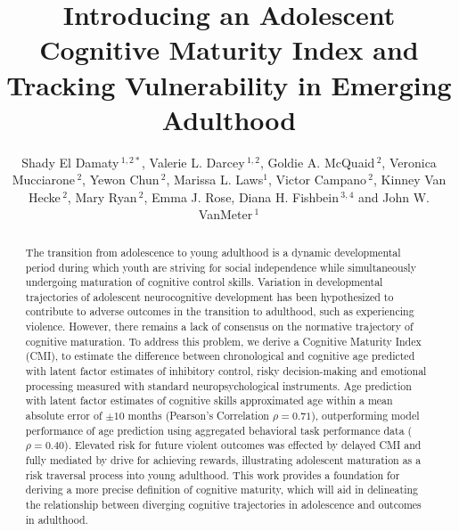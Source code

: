 \documentclass[utf8]{stylesheet}
\def\firstAuthorLast{El Damaty {et~al.}} %
\def\Authors{Shady El Damaty\,$^{1,2*}$, Valerie L. Darcey\,$^{1,2}$, Goldie A. McQuaid\,$^{2}$, Veronica Mucciarone\,$^{2}$, Yewon Chun\,$^{2}$, Marissa L. Laws$^{1}$, Victor Campano\,$^{2}$, Kinney Van Hecke\,$^{2}$, Mary Ryan\,$^{2}$, Emma J. Rose, Diana H. Fishbein\,$^{3,4}$ and John W. VanMeter\,$^{1}$}
\begin{document}
\onecolumn
{}
\title{Introducing an Adolescent Cognitive Maturity Index and Tracking Vulnerability in Emerging Adulthood} 
\author[\firstAuthorLast ]{\Authors} %
\address{} %
\correspondance{} %
\extraAuth{}
\maketitle \begin{abstract}
The transition from adolescence to young adulthood is a dynamic developmental period during which youth are striving for social independence while simultaneously undergoing maturation of cognitive control skills. Variation in developmental trajectories of adolescent neurocognitive development has been hypothesized to contribute to adverse outcomes in the transition to adulthood, such as experiencing violence. However, there remains a lack of consensus on the normative trajectory of cognitive maturation. To address this problem, we derive a Cognitive Maturity Index (CMI), to estimate the difference between chronological and cognitive age predicted with latent factor estimates of inhibitory control, risky decision-making and emotional processing measured with standard neuropsychological instruments. Age prediction with latent factor estimates of cognitive skills approximated age within a mean absolute error of $\pm 10$ months (Pearson's Correlation $\rho=0.71$), outperforming model performance of age prediction using aggregated behavioral task performance data ($\rho=0.40$). Elevated risk for future violent outcomes was effected by delayed CMI and fully mediated by drive for achieving rewards, illustrating adolescent maturation as a risk traversal process into young adulthood. This work provides a foundation for deriving a more precise definition of cognitive maturity, which will aid in delineating the relationship between diverging cognitive trajectories in adolescence and outcomes in adulthood.


\end{abstract}
\end{document}
